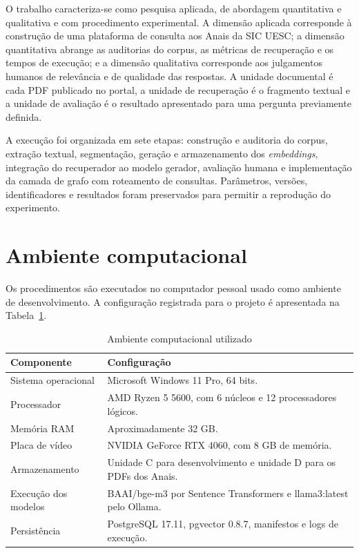 O trabalho caracteriza-se como pesquisa aplicada, de abordagem quantitativa e qualitativa e com procedimento experimental. A dimensão aplicada corresponde à construção de uma plataforma de consulta aos Anais da SIC UESC; a dimensão quantitativa abrange as auditorias do corpus, as métricas de recuperação e os tempos de execução; e a dimensão qualitativa corresponde aos julgamentos humanos de relevância e de qualidade das respostas. A unidade documental é cada PDF publicado no portal, a unidade de recuperação é o fragmento textual e a unidade de avaliação é o resultado apresentado para uma pergunta previamente definida.

A execução foi organizada em sete etapas: construção e auditoria do corpus, extração textual, segmentação, geração e armazenamento dos \textit{embeddings}, integração do recuperador ao modelo gerador, avaliação humana e implementação da camada de grafo com roteamento de consultas. Parâmetros, versões, identificadores e resultados foram preservados para permitir a reprodução do experimento.

\section{Ambiente computacional}

Os procedimentos são executados no computador pessoal usado como ambiente de desenvolvimento. A configuração registrada para o projeto é apresentada na Tabela~\ref{tab:ambiente}.

\begin{table}[htbp]
\centering
\caption{Ambiente computacional utilizado}
\label{tab:ambiente}
\renewcommand{\arraystretch}{1.2}
\small
\begin{tabularx}{\textwidth}{>{\raggedright\arraybackslash}p{4.2cm}>{\raggedright\arraybackslash}X}
\toprule
\textbf{Componente} & \textbf{Configuração} \\ \midrule
Sistema operacional & Microsoft Windows 11 Pro, 64 bits. \\
Processador & AMD Ryzen 5 5600, com 6 núcleos e 12 processadores lógicos. \\
Memória RAM & Aproximadamente 32 GB. \\
Placa de vídeo & NVIDIA GeForce RTX 4060, com 8 GB de memória. \\
Armazenamento & Unidade C para desenvolvimento e unidade D para os PDFs dos Anais. \\
Execução dos modelos & BAAI/bge-m3 por Sentence Transformers e llama3:latest pelo Ollama. \\
Persistência & PostgreSQL 17.11, pgvector 0.8.7, manifestos e logs de execução. \\ \bottomrule
\end{tabularx}
\end{table}


